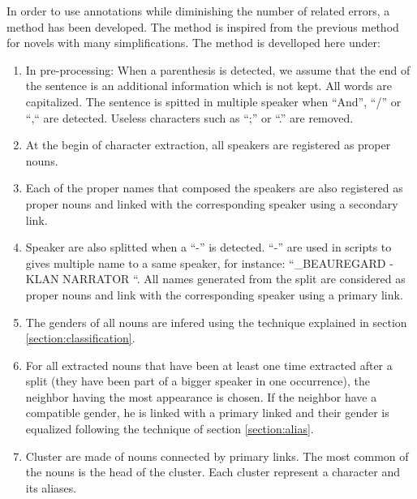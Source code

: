 \documentclass[a4paper, 12pt]{report}
\begin{document}
In order to use annotations while diminishing the number of related errors, a method has been developed. The method is inspired from the previous method for novels with many simplifications. The method is develloped here under:
\begin{enumerate}
\item In pre-processing: When a parenthesis is detected, we assume that the end of the sentence is an additional information which is not kept. All words are capitalized. The sentence is spitted in multiple speaker when ``And'', ``/''  or ``,`` are detected.   Useless characters such as ``;'' or ``.'' are removed.
\item At the begin of character extraction, all speakers are registered as proper nouns.
\item Each of the proper names that composed the speakers are also registered as proper nouns and linked with the corresponding speaker using a secondary link.
\item Speaker are also splitted when a ``-'' is detected. ``-'' are used in scripts to gives multiple name to a same speaker, for instance: ``_BEAUREGARD - KLAN NARRATOR ``. All names generated from the split are considered as proper nouns and link with the corresponding speaker using a primary link.
\item The genders of all nouns are infered using the technique explained in section \ref{section:classification}.
\item For all extracted nouns that have been at least one time extracted after a split (they have been part of a bigger speaker in one occurrence), the  neighbor having the most appearance is chosen. If the neighbor have a compatible gender, he is linked with a primary linked and their gender is equalized following the technique of section \ref{section:alias}.
\item Cluster are made of nouns connected by primary links. The most common of the nouns is the head of the cluster. Each cluster represent a character and its aliases.
\end{enumerate}
\end{document}
